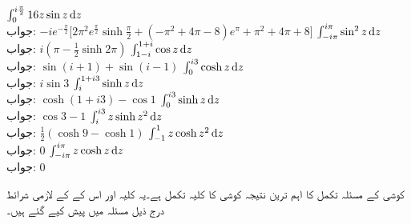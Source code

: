 \quad
$\int_{0}^{i\frac{\pi}{2}}16 z\sin z\dif z$\\
جواب:\quad
$-ie^{-\tfrac{\pi}{2}}\big[2\pi^2e^{\tfrac{\pi}{2}}\sinh \tfrac{\pi}{2}+(-\pi^2+4\pi-8)e^{\pi}+\pi^2+4\pi+8\big]$
\quad
$\int_{-i\pi}^{i\pi}\sin^2 z\dif z$\\
جواب:\quad
$i(\pi-\tfrac{1}{2}\sinh 2\pi)$
\quad
$\int_{1-i}^{1+i}\cos z\dif z$\\
جواب:\quad
$\sin(i+1)+\sin(i-1)$
\quad
$\int_{0}^{i3}\cosh z\dif z$\\
جواب:\quad
$i\sin 3$
\quad
$\int_{i}^{1+i3}\sinh z\dif z$\\
جواب:\quad
$\cosh(1+i3)-\cos 1$
\quad
$\int_{0}^{i3}\sinh z\dif z$\\
جواب:\quad
$\cos 3-1$
\quad
$\int_{i}^{i3}z\sinh z^2\dif z$\\
جواب:\quad
$\tfrac{1}{2}(\cosh 9-\cosh 1)$
\quad
$\int_{-1}^{1}z\cosh z^2\dif z$\\
جواب:\quad
$0$
\quad
$\int_{-i\pi}^{i\pi}z\cosh z\dif z$\\
جواب:\quad
$0$

کوشی کے مسئلہ تکمل کا اہم ترین نتیجہ کوشی کا کلیہ تکمل ہے۔یہ کلیہ اور اس کے کے لازمی شرائط درج ذیل مسئلہ میں پیش کیے گئے ہیں۔

